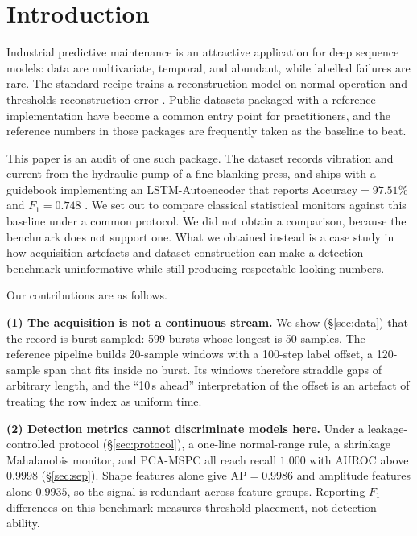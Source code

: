 \documentclass{article}
\begin{document}
\section{Introduction}
\label{sec:intro}

Industrial predictive maintenance is an attractive application for deep
sequence models: data are multivariate, temporal, and abundant, while labelled
failures are rare. The standard recipe trains a reconstruction model on
normal operation and thresholds reconstruction error
\citep{malhotra2016lstmae,audibert2020usad}. Public datasets packaged with a
reference implementation have become a common entry point for practitioners,
and the reference numbers in those packages are frequently taken as the
baseline to beat.

This paper is an audit of one such package. The dataset records vibration and
current from the hydraulic pump of a fine-blanking press, and ships with a
guidebook implementing an LSTM-Autoencoder that reports
$\mathrm{Accuracy}=97.51\%$ and $F_1=0.748$ \citep{kamp2022press}. We set out
to compare classical statistical monitors against this baseline under a common
protocol. We did not obtain a comparison, because the benchmark does not
support one. What we obtained instead is a case study in how acquisition
artefacts and dataset construction can make a detection benchmark
uninformative while still producing respectable-looking numbers.

Our contributions are as follows.

\textbf{(1) The acquisition is not a continuous stream.} We show
(\S\ref{sec:data}) that the record is burst-sampled: 599 bursts whose longest
is 50 samples. The reference pipeline builds 20-sample windows with a
100-step label offset, a 120-sample span that fits inside no burst. Its
windows therefore straddle gaps of arbitrary length, and the ``10\,s ahead''
interpretation of the offset is an artefact of treating the row index as
uniform time.

\textbf{(2) Detection metrics cannot discriminate models here.} Under a
leakage-controlled protocol (\S\ref{sec:protocol}), a one-line normal-range
rule, a shrinkage Mahalanobis monitor, and PCA-MSPC all reach recall $1.000$
with AUROC above $0.9998$ (\S\ref{sec:sep}). Shape features alone give
$\mathrm{AP} = 0.9986$ and amplitude features alone $0.9935$, so the signal is
redundant across feature groups. Reporting $F_1$ differences on this benchmark
measures threshold placement, not detection ability.
\end{document}
